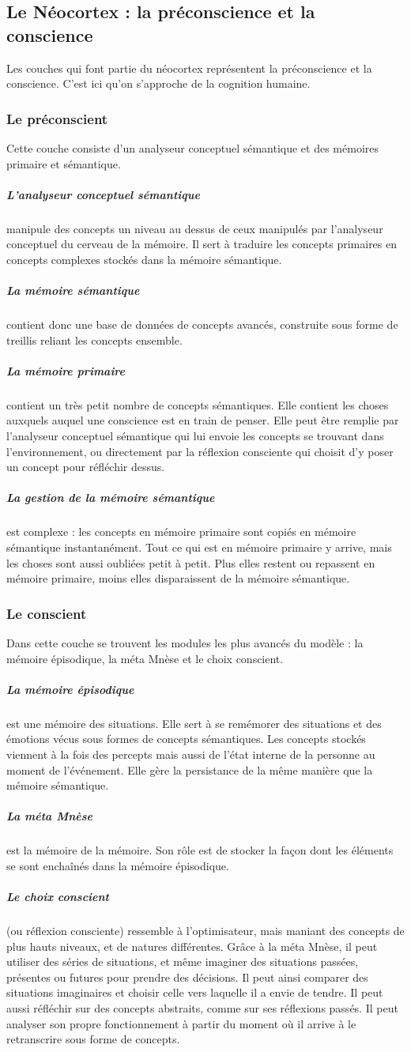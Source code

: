 \subsection{Le Néocortex : la préconscience et la conscience}
Les couches qui font partie du néocortex représentent la préconscience et la
conscience. C'est ici qu'on s'approche de la cognition humaine.
\subsubsection{Le préconscient} Cette couche consiste d'un analyseur
conceptuel sémantique et des mémoires primaire et sémantique.
\subparagraph{L'analyseur conceptuel sémantique} manipule des concepts un niveau
au dessus de ceux manipulés par l’analyseur conceptuel du cerveau de la mémoire. Il sert à
traduire les concepts primaires en concepts complexes stockés dans la mémoire
sémantique.
\subparagraph{La mémoire sémantique} contient donc une base de
données de concepts avancés, construite sous forme de treillis reliant les concepts ensemble.
\subparagraph{La mémoire primaire} contient un très petit nombre de concepts
sémantiques. Elle contient les choses auxquels auquel une conscience est en
train de penser. Elle peut être remplie par l’analyseur conceptuel sémantique qui lui envoie les
concepts se trouvant dans l’environnement, ou directement par la réflexion
consciente qui choisit d’y poser un concept pour réfléchir dessus.
\subparagraph{La gestion de la mémoire sémantique} est complexe : les concepts
en mémoire primaire sont copiés en mémoire sémantique instantanément. Tout ce qui est en
mémoire primaire y arrive, mais les choses sont aussi oubliées petit à petit.
Plus elles restent ou repassent en mémoire primaire, moins elles disparaissent
de la mémoire sémantique.
\subsubsection{Le conscient} Dans cette couche se trouvent les modules les plus
avancés du modèle : la mémoire épisodique, la méta Mnèse  et le choix conscient.
\subparagraph{La mémoire épisodique} est une mémoire des situations. Elle sert à
se remémorer des situations et des émotions vécus sous formes de concepts sémantiques. Les
concepts stockés viennent à la fois des percepts mais aussi de l’état interne de
la personne au moment de l’événement. Elle gère la persistance de la même
manière que la mémoire sémantique.
\subparagraph{La méta Mnèse} est la mémoire de la mémoire. Son rôle est de stocker la
façon dont les éléments se sont enchaînés dans la mémoire épisodique.
\subparagraph{Le choix conscient} (ou réflexion consciente) ressemble à l'optimisateur,
mais maniant des concepts de plus hauts niveaux, et de natures différentes. Grâce à
la méta Mnèse, il peut utiliser des séries de situations, et même imaginer des
situations passées, présentes ou futures pour prendre des décisions. Il peut
ainsi comparer des situations imaginaires et choisir celle vers laquelle il a
envie de tendre. Il peut aussi réfléchir sur des concepts abstraits, comme sur
ses réflexions passés. Il peut analyser son propre fonctionnement à partir du
moment où il arrive à le retranscrire sous forme de concepts.

